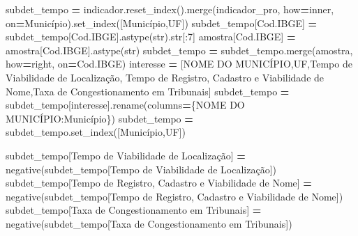 \documentclass[
  12,
  dvipsnames]{article}
\newenvironment{Shaded}{\begin{snugshade}}{\end{snugshade}}
\newcommand{\BuiltInTok}[1]{#1}
\newcommand{\DecValTok}[1]{\textcolor[rgb]{0.00,0.00,0.81}{#1}}
\newcommand{\NormalTok}[1]{#1}
\newcommand{\OperatorTok}[1]{\textcolor[rgb]{0.81,0.36,0.00}{\textbf{#1}}}
\newcommand{\StringTok}[1]{\textcolor[rgb]{0.31,0.60,0.02}{#1}}
\begin{document}
\begin{Shaded}
\begin{Highlighting}[]
\NormalTok{subdet\_tempo }\OperatorTok{=}\NormalTok{ indicador.reset\_index().merge(indicador\_pro, how}\OperatorTok{=}\StringTok{\textquotesingle{}inner\textquotesingle{}}\NormalTok{, on}\OperatorTok{=}\StringTok{\textquotesingle{}Município\textquotesingle{}}\NormalTok{).set\_index([}\StringTok{\textquotesingle{}Município\textquotesingle{}}\NormalTok{,}\StringTok{\textquotesingle{}UF\textquotesingle{}}\NormalTok{])}
\NormalTok{subdet\_tempo[}\StringTok{\textquotesingle{}Cod.IBGE\textquotesingle{}}\NormalTok{] }\OperatorTok{=}\NormalTok{ subdet\_tempo[}\StringTok{\textquotesingle{}Cod.IBGE\textquotesingle{}}\NormalTok{].astype(}\BuiltInTok{str}\NormalTok{).}\BuiltInTok{str}\NormalTok{[:}\DecValTok{7}\NormalTok{]}
\NormalTok{amostra[}\StringTok{\textquotesingle{}Cod.IBGE\textquotesingle{}}\NormalTok{] }\OperatorTok{=}\NormalTok{ amostra[}\StringTok{\textquotesingle{}Cod.IBGE\textquotesingle{}}\NormalTok{].astype(}\BuiltInTok{str}\NormalTok{)}
\NormalTok{subdet\_tempo }\OperatorTok{=}\NormalTok{ subdet\_tempo.merge(amostra, how}\OperatorTok{=}\StringTok{\textquotesingle{}right\textquotesingle{}}\NormalTok{, on}\OperatorTok{=}\StringTok{\textquotesingle{}Cod.IBGE\textquotesingle{}}\NormalTok{)}
\NormalTok{interesse }\OperatorTok{=}\NormalTok{ [}\StringTok{\textquotesingle{}NOME DO MUNICÍPIO\textquotesingle{}}\NormalTok{,}\StringTok{\textquotesingle{}UF\textquotesingle{}}\NormalTok{,}\StringTok{\textquotesingle{}Tempo de Viabilidade de Localização\textquotesingle{}}\NormalTok{,}
             \StringTok{\textquotesingle{}Tempo de Registro, Cadastro e Viabilidade de Nome\textquotesingle{}}\NormalTok{,}\StringTok{\textquotesingle{}Taxa de Congestionamento em Tribunais\textquotesingle{}}\NormalTok{]}
\NormalTok{subdet\_tempo }\OperatorTok{=}\NormalTok{ subdet\_tempo[interesse].rename(columns}\OperatorTok{=}\NormalTok{\{}\StringTok{\textquotesingle{}NOME DO MUNICÍPIO\textquotesingle{}}\NormalTok{:}\StringTok{\textquotesingle{}Município\textquotesingle{}}\NormalTok{\})}
\NormalTok{subdet\_tempo }\OperatorTok{=}\NormalTok{ subdet\_tempo.set\_index([}\StringTok{\textquotesingle{}Município\textquotesingle{}}\NormalTok{,}\StringTok{\textquotesingle{}UF\textquotesingle{}}\NormalTok{])}

\NormalTok{subdet\_tempo[}\StringTok{\textquotesingle{}Tempo de Viabilidade de Localização\textquotesingle{}}\NormalTok{] }\OperatorTok{=}\NormalTok{ negative(subdet\_tempo[}\StringTok{\textquotesingle{}Tempo de Viabilidade de Localização\textquotesingle{}}\NormalTok{])}
\NormalTok{subdet\_tempo[}\StringTok{\textquotesingle{}Tempo de Registro, Cadastro e Viabilidade de Nome\textquotesingle{}}\NormalTok{] }\OperatorTok{=}\NormalTok{ negative(subdet\_tempo[}\StringTok{\textquotesingle{}Tempo de Registro, Cadastro e Viabilidade de Nome\textquotesingle{}}\NormalTok{])}
\NormalTok{subdet\_tempo[}\StringTok{\textquotesingle{}Taxa de Congestionamento em Tribunais\textquotesingle{}}\NormalTok{] }\OperatorTok{=}\NormalTok{ negative(subdet\_tempo[}\StringTok{\textquotesingle{}Taxa de Congestionamento em Tribunais\textquotesingle{}}\NormalTok{])}


\end{Highlighting}
\end{Shaded}
\end{document}

